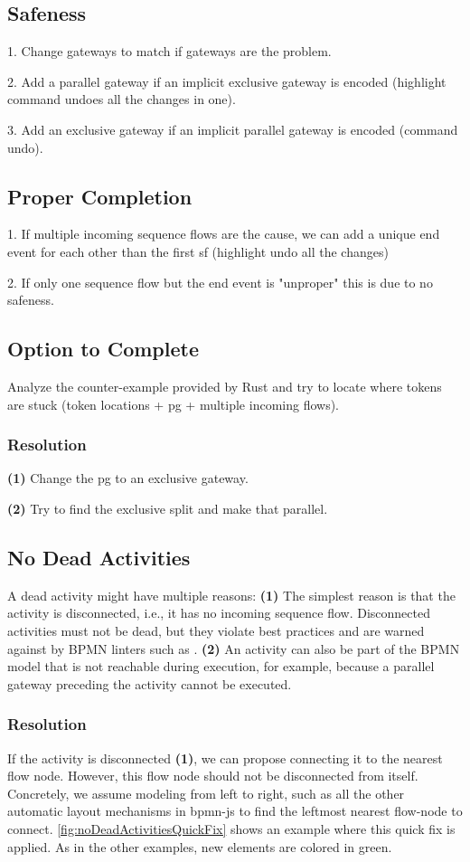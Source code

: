 \documentclass[runningheads]{llncs}
\begin{document}
\subsection{Safeness}
1. Change gateways to match if gateways are the problem.

2. Add a parallel gateway if an implicit exclusive gateway is encoded (highlight command undoes all the changes in one).

3. Add an exclusive gateway if an implicit parallel gateway is encoded (command undo).
\subsection{Proper Completion}
1. If multiple incoming sequence flows are the cause, we can add a unique end event for each other than the first sf (highlight undo all the changes)

2. If only one sequence flow but the end event is "unproper" this is due to no safeness.
\subsection{Option to Complete}
Analyze the counter-example provided by Rust and try to locate where tokens are stuck (token locations + pg + multiple incoming flows).

\subsubsection{Resolution} \textbf{(1)} Change the pg to an exclusive gateway.

\textbf{(2)} Try to find the exclusive split and make that parallel. 
\subsection{No Dead Activities}
A dead activity might have multiple reasons:
\textbf{(1)} The simplest reason is that the activity is disconnected, i.e., it has no incoming sequence flow.
Disconnected activities must not be dead, but they violate best practices and are warned against by BPMN linters such as \cite[rule no-disconnected]{camundaservicesgmbhBpmnlint2023}.
\textbf{(2)} An activity can also be part of the BPMN model that is not reachable during execution, for example, because a parallel gateway preceding the activity cannot be executed.

\subsubsection{Resolution}
If the activity is disconnected \textbf{(1)}, we can propose connecting it to the nearest flow node.
However, this flow node should not be disconnected from itself.
Concretely, we assume modeling from left to right, such as all the other automatic layout mechanisms in bpmn-js \cite{camundaservicesgmbhBpmnjs2023} to find the leftmost nearest flow-node to connect.
\autoref{fig:noDeadActivitiesQuickFix} shows an example where this quick fix is applied.
As in the other examples, new elements are colored in green.
\end{document}

